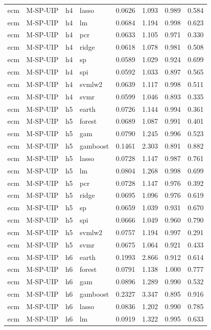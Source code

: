 \begin{ThreePartTable}
\begin{longtable}[t]{llclcccc}
ecm & M-SP-UIP & h4 & lasso & 0.0626 & 1.093 & 0.989 & 0.584\\
ecm & M-SP-UIP & h4 & lm & 0.0684 & 1.194 & 0.998 & 0.623\\
ecm & M-SP-UIP & h4 & pcr & 0.0633 & 1.105 & 0.971 & 0.330\\
ecm & M-SP-UIP & h4 & ridge & 0.0618 & 1.078 & 0.981 & 0.508\\
ecm & M-SP-UIP & h4 & sp & 0.0589 & 1.029 & 0.924 & 0.699\\
ecm & M-SP-UIP & h4 & spi & 0.0592 & 1.033 & 0.897 & 0.565\\
ecm & M-SP-UIP & h4 & svmlw2 & 0.0639 & 1.117 & 0.998 & 0.511\\
ecm & M-SP-UIP & h4 & svmr & 0.0599 & 1.046 & 0.893 & 0.335\\
\addlinespace
ecm & M-SP-UIP & h5 & earth & 0.0726 & 1.144 & 0.994 & 0.361\\
ecm & M-SP-UIP & h5 & forest & 0.0689 & 1.087 & 0.991 & 0.401\\
ecm & M-SP-UIP & h5 & gam & 0.0790 & 1.245 & 0.996 & 0.523\\
ecm & M-SP-UIP & h5 & gamboost & 0.1461 & 2.303 & 0.891 & 0.882\\
ecm & M-SP-UIP & h5 & lasso & 0.0728 & 1.147 & 0.987 & 0.761\\
ecm & M-SP-UIP & h5 & lm & 0.0804 & 1.268 & 0.998 & 0.699\\
ecm & M-SP-UIP & h5 & pcr & 0.0728 & 1.147 & 0.976 & 0.392\\
ecm & M-SP-UIP & h5 & ridge & 0.0695 & 1.096 & 0.976 & 0.619\\
ecm & M-SP-UIP & h5 & sp & 0.0659 & 1.039 & 0.931 & 0.670\\
ecm & M-SP-UIP & h5 & spi & 0.0666 & 1.049 & 0.960 & 0.790\\
ecm & M-SP-UIP & h5 & svmlw2 & 0.0757 & 1.194 & 0.997 & 0.291\\
ecm & M-SP-UIP & h5 & svmr & 0.0675 & 1.064 & 0.921 & 0.433\\
\addlinespace
ecm & M-SP-UIP & h6 & earth & 0.1993 & 2.866 & 0.912 & 0.614\\
ecm & M-SP-UIP & h6 & forest & 0.0791 & 1.138 & 1.000 & 0.777\\
ecm & M-SP-UIP & h6 & gam & 0.0896 & 1.289 & 0.990 & 0.532\\
ecm & M-SP-UIP & h6 & gamboost & 0.2327 & 3.347 & 0.895 & 0.916\\
ecm & M-SP-UIP & h6 & lasso & 0.0836 & 1.202 & 0.990 & 0.785\\
ecm & M-SP-UIP & h6 & lm & 0.0919 & 1.322 & 0.995 & 0.633\\

\end{longtable}
\end{ThreePartTable}
